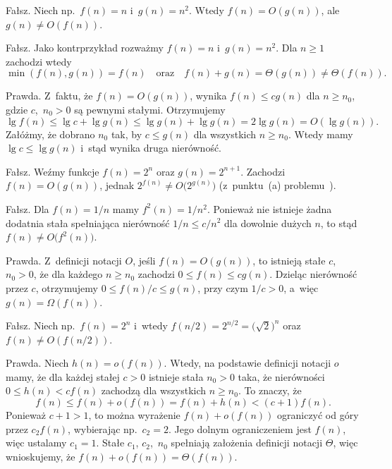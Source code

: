 
\subproblem %
Fałsz. Niech np.\ $f(n)=n$ i~$g(n)=n^2$. Wtedy $f(n)=O(g(n))$, ale $g(n)\ne O(f(n))$.

\subproblem %
Fałsz. Jako kontrprzykład rozważmy $f(n)=n$ i~$g(n)=n^2$. Dla $n\ge1$ zachodzi wtedy
\[
	\min(f(n),g(n)) = f(n) \quad\text{oraz}\quad f(n)+g(n) = \Theta(g(n)) \ne \Theta(f(n)).
\]

\subproblem %
Prawda. Z~faktu, że $f(n)=O(g(n))$, wynika $f(n)\le cg(n)$ dla $n\ge n_0$, gdzie $c$,~$n_0>0$ są pewnymi stałymi. Otrzymujemy
\[
	\lg f(n) \le \lg c+\lg g(n) \le \lg g(n)+\lg g(n) = 2\lg g(n) = O(\lg g(n)).
\]
Załóżmy, że dobrano $n_0$ tak, by $c\le g(n)$ dla wszystkich $n\ge n_0$. Wtedy mamy $\lg c\le\lg g(n)$ i~stąd wynika druga nierówność.

\subproblem %
Fałsz. Weźmy funkcje $f(n)=2^n$ oraz $g(n)=2^{n+1}$. Zachodzi $f(n)=O(g(n))$, jednak $2^{f(n)}\ne O\bigl(2^{g(n)}\bigr)$ (z~punktu~(a) problemu~).

\subproblem %
Fałsz. Dla $f(n)=1/n$ mamy $f^2(n)=1/n^2$. Ponieważ nie istnieje żadna dodatnia stała spełniająca nierówność $1/n\le c/n^2$ dla dowolnie dużych $n$, to stąd $f(n)\ne O\bigl(f^2(n)\bigr)$.

\subproblem %
Prawda. Z~definicji notacji $O$, jeśli $f(n)=O(g(n))$, to istnieją stałe $c$,~$n_0>0$, że dla każdego $n\ge n_0$ zachodzi $0\le f(n)\le cg(n)$. Dzieląc nierówność przez $c$, otrzymujemy $0\le f(n)/c\le g(n)$, przy czym $1/c>0$, a~więc $g(n)=\Omega(f(n))$.

\subproblem %
Fałsz. Niech np.\ $f(n)=2^n$ i~wtedy $f(n/2)=2^{n/2}={\bigl(\!\sqrt{2}\bigr)}^n$ oraz $f(n)\ne O(f(n/2))$.

\subproblem %
Prawda. Niech $h(n)=o(f(n))$. Wtedy, na podstawie definicji notacji $o$ mamy, że dla każdej stałej $c>0$ istnieje stała $n_0>0$ taka, że nierówności $0\le h(n)<cf(n)$ zachodzą dla wszystkich $n\ge n_0$. To znaczy, że
\[
	f(n) \le f(n)+o(f(n)) = f(n)+h(n) < (c+1)f(n).
\]
Ponieważ $c+1>1$, to można wyrażenie $f(n)+o(f(n))$ ograniczyć od góry przez $c_2f(n)$, wybierając np.\ $c_2=2$. Jego dolnym ograniczeniem jest $f(n)$, więc ustalamy $c_1=1$. Stałe $c_1$, $c_2$,~$n_0$ spełniają założenia definicji notacji $\Theta$, więc wnioskujemy, że $f(n)+o(f(n))=\Theta(f(n))$.

\bigskip
{}

